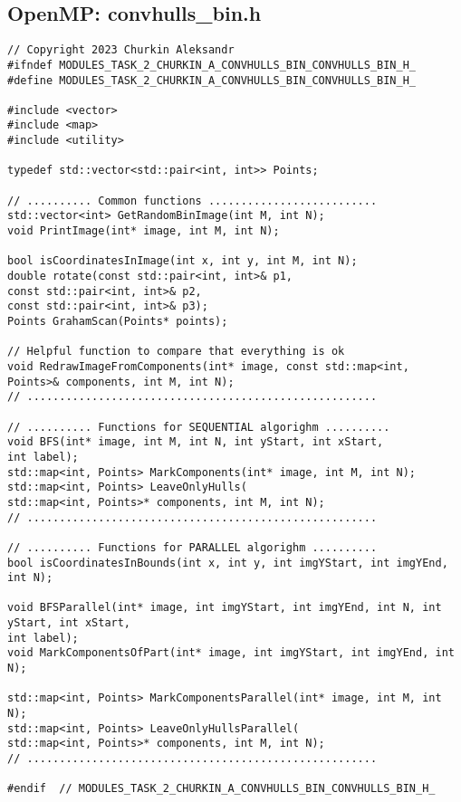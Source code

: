 \documentclass[14pt, russian]{extarticle}
\begin{document}
	\subsection{OpenMP: convhulls\_bin.h}
	\begin{lstlisting}
// Copyright 2023 Churkin Aleksandr
#ifndef MODULES_TASK_2_CHURKIN_A_CONVHULLS_BIN_CONVHULLS_BIN_H_
#define MODULES_TASK_2_CHURKIN_A_CONVHULLS_BIN_CONVHULLS_BIN_H_

#include <vector>
#include <map>
#include <utility>

typedef std::vector<std::pair<int, int>> Points;

// .......... Common functions ..........................
std::vector<int> GetRandomBinImage(int M, int N);
void PrintImage(int* image, int M, int N);

bool isCoordinatesInImage(int x, int y, int M, int N);
double rotate(const std::pair<int, int>& p1,
const std::pair<int, int>& p2,
const std::pair<int, int>& p3);
Points GrahamScan(Points* points);

// Helpful function to compare that everything is ok
void RedrawImageFromComponents(int* image, const std::map<int, Points>& components, int M, int N);
// ......................................................

// .......... Functions for SEQUENTIAL algorighm ..........
void BFS(int* image, int M, int N, int yStart, int xStart,
int label);
std::map<int, Points> MarkComponents(int* image, int M, int N);
std::map<int, Points> LeaveOnlyHulls(
std::map<int, Points>* components, int M, int N);
// ......................................................

// .......... Functions for PARALLEL algorighm ..........
bool isCoordinatesInBounds(int x, int y, int imgYStart, int imgYEnd, int N);

void BFSParallel(int* image, int imgYStart, int imgYEnd, int N, int yStart, int xStart,
int label);
void MarkComponentsOfPart(int* image, int imgYStart, int imgYEnd, int N);

std::map<int, Points> MarkComponentsParallel(int* image, int M, int N);
std::map<int, Points> LeaveOnlyHullsParallel(
std::map<int, Points>* components, int M, int N);
// ......................................................

#endif  // MODULES_TASK_2_CHURKIN_A_CONVHULLS_BIN_CONVHULLS_BIN_H_

	\end{lstlisting}
	\newpage
\end{document}
